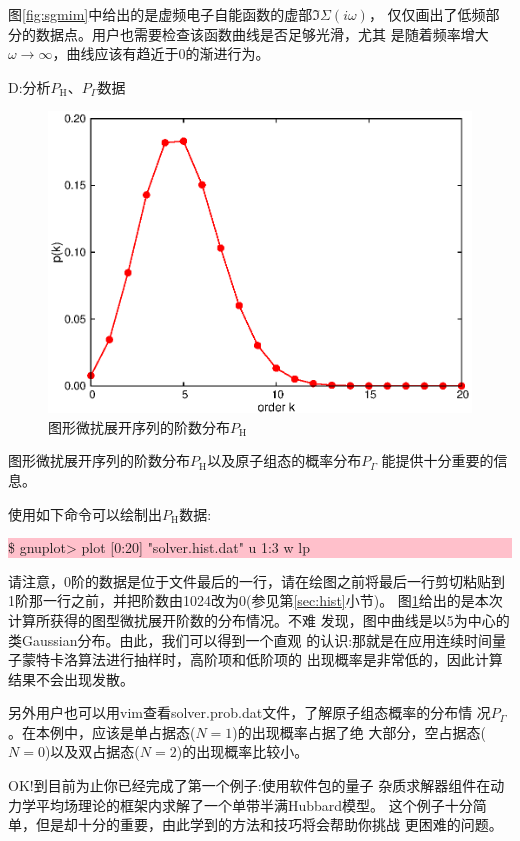 图\ref{fig:sgmim}中给出的是虚频电子自能函数的虚部$\Im \Sigma(i\omega)$，
仅仅画出了低频部分的数据点。用户也需要检查该函数曲线是否足够光滑，尤其
是随着频率增大$\omega \rightarrow \infty$，曲线应该有趋近于0的渐进行为。

D:分析$P_{\text{H}}$、$P_{\Gamma}$数据

\begin{figure}
\centering
\includegraphics{figure/hist.eps}
\caption{图形微扰展开序列的阶数分布$P_{\text{H}}$} 
\label{fig:hist}
\end{figure}

图形微扰展开序列的阶数分布$P_{\text{H}}$以及原子组态的概率分布$P_{\Gamma}$
能提供十分重要的信息。

使用如下命令可以绘制出$P_{\text{H}}$数据:

\noindent\colorbox{pink}{\parbox[r]{\linewidth}{\quad \$ gnuplot> plot [0:20] "solver.hist.dat" u 1:3 w lp }}

请注意，0阶的数据是位于文件最后的一行，请在绘图之前将最后一行剪切粘贴到
1阶那一行之前，并把阶数由1024改为0(参见第\ref{sec:hist}小节)。
图\ref{fig:hist}给出的是本次计算所获得的图型微扰展开阶数的分布情况。不难
发现，图中曲线是以5为中心的类Gaussian分布。由此，我们可以得到一个直观
的认识:那就是在应用连续时间量子蒙特卡洛算法进行抽样时，高阶项和低阶项的
出现概率是非常低的，因此计算结果不会出现发散。

另外用户也可以用vim查看solver.prob.dat文件，了解原子组态概率的分布情
况$P_{\Gamma}$。在本例中，应该是单占据态($N = 1$)的出现概率占据了绝
大部分，空占据态($N = 0$)以及双占据态($N = 2$)的出现概率比较小。

OK!到目前为止你已经完成了第一个例子:使用{\iqist}软件包的{\azalea}量子
杂质求解器组件在动力学平均场理论的框架内求解了一个单带半满Hubbard模型。
这个例子十分简单，但是却十分的重要，由此学到的方法和技巧将会帮助你挑战
更困难的问题。

